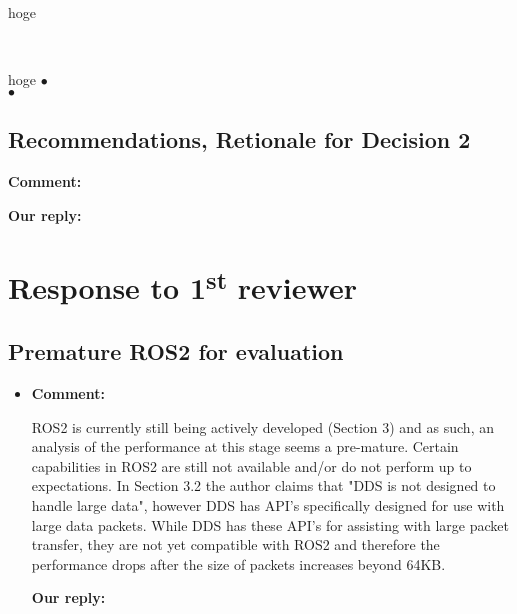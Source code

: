 \documentclass{article}
\newcommand\st{\textsuperscript{st}\xspace}
\begin{document}
\begin{itembox}[|]{hoge }
\end{itembox}\\

\begin{itembox}[|]{hoge}
  $\bullet$\\
  $\bullet$\\
\end{itembox}

\subsection{Recommendations, Retionale for Decision 2}

\begin{flushleft}
  \textbf{Comment:}
\end{flushleft}

\begin{flushleft}
  \textbf{Our reply:}
\end{flushleft}


\newpage


\section{Response to 1\st reviewer}

\subsection{Premature ROS2 for evaluation}
\begin{itemize}

\item \begin{flushleft}
    \textbf{Comment:}
  \end{flushleft}
  ROS2 is currently still being actively developed (Section 3) and as such, an analysis of the performance at this stage seems a pre-mature. Certain capabilities in ROS2 are still not available and/or do not perform up to expectations. In Section 3.2 the author claims that "DDS is not designed to handle large data", however DDS has API's specifically designed for use with large data packets. While DDS has these API’s for assisting with large packet transfer, they are not yet compatible with ROS2 and therefore the performance drops after the size of packets increases beyond 64KB.

  \begin{flushleft}
    \textbf{Our reply:}
  \end{flushleft}

\end{itemize}
\end{document}
